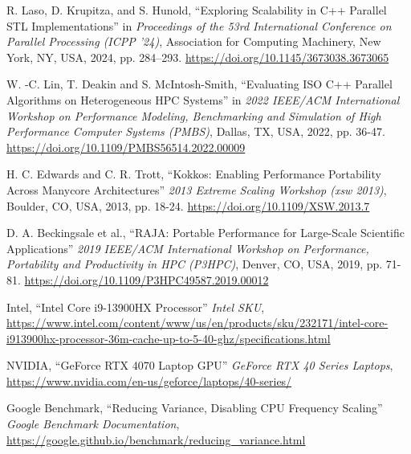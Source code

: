 \documentclass[sigconf]{acmart}
\begin{document}
\balance{}

\begin{thebibliography}{1}

      R. Laso, D. Krupitza, and S. Hunold, ``Exploring Scalability in C++ Parallel STL Implementations'' in \textit{Proceedings of the 53rd International Conference on Parallel Processing (ICPP '24)},
      Association for Computing Machinery, New York, NY, USA, 2024, pp. 284--293.
      \url{https://doi.org/10.1145/3673038.3673065}

      W. -C. Lin, T. Deakin and S. McIntosh-Smith, ``Evaluating ISO C++ Parallel Algorithms on Heterogeneous HPC Systems'' in  \textit{2022 IEEE/ACM International Workshop on Performance Modeling, Benchmarking and Simulation of High Performance Computer Systems (PMBS)},
      Dallas, TX, USA, 2022, pp. 36-47.
      \url{https://doi.org/10.1109/PMBS56514.2022.00009}

      H. C. Edwards and C. R. Trott, ``Kokkos: Enabling Performance Portability Across Manycore Architectures'' \textit{2013 Extreme Scaling Workshop (xsw 2013)},
      Boulder, CO, USA, 2013, pp. 18-24.
      \url{https://doi.org/10.1109/XSW.2013.7}

      D. A. Beckingsale et al., ``RAJA: Portable Performance for Large-Scale Scientific Applications'' \textit{2019 IEEE/ACM International Workshop on Performance, Portability and Productivity in HPC (P3HPC)},
      Denver, CO, USA, 2019, pp. 71-81.
      \url{https://doi.org/10.1109/P3HPC49587.2019.00012}

      Intel, ``Intel Core i9-13900HX Processor'' \textit{Intel SKU},
      \url{https://www.intel.com/content/www/us/en/products/sku/232171/intel-core-i913900hx-processor-36m-cache-up-to-5-40-ghz/specifications.html}

      NVIDIA, ``GeForce RTX 4070 Laptop GPU'' \textit{GeForce RTX 40 Series Laptops},
      \url{https://www.nvidia.com/en-us/geforce/laptops/40-series/}

      Google Benchmark, ``Reducing Variance, Disabling CPU Frequency Scaling'' \textit{Google Benchmark Documentation},
      \url{https://google.github.io/benchmark/reducing_variance.html}

\end{thebibliography}
\end{document}
